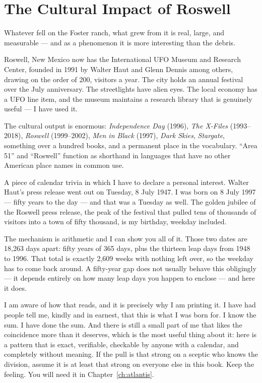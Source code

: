 \section{The Cultural Impact of Roswell}\label{sec:culturalimpactroswell}

Whatever fell on the Foster ranch, what grew from it is real, large, and measurable --- and as a
phenomenon it is more interesting than the debris.

Roswell, New Mexico now has the International UFO Museum and Research Center, founded in 1991 by
Walter Haut and Glenn Dennis among others, drawing on the order of 200, visitors a year. The
city holds an annual festival over the July anniversary. The streetlights have alien eyes. The
local economy has a UFO line item, and the museum maintains a research library that is genuinely
useful --- I have used it.

The cultural output is enormous: \emph{Independence Day} (1996), \emph{The X-Files} (1993--2018),
\emph{Roswell} (1999--2002), \emph{Men in Black} (1997), \emph{Dark Skies}, \emph{Stargate},
something over a hundred books, and a permanent place in the vocabulary. ``Area 51'' and
``Roswell'' function as shorthand in languages that have no other American place names in common
use.

\begin{funfact}
A piece of calendar trivia in which I have to declare a personal interest. Walter Haut's press
release went out on Tuesday, 8 July 1947. I was born on 8 July 1997 --- fifty years to the day ---
and that was a Tuesday as well. The golden jubilee of the Roswell press release, the peak of the
festival that pulled tens of thousands of visitors into a town of fifty thousand, is my birthday,
weekday included.

The mechanism is arithmetic and I can show you all of it. Those two dates are 18,263 days apart:
fifty years of 365 days, plus the thirteen leap days from 1948 to 1996. That total is exactly 2,609
weeks with nothing left over, so the weekday has to come back around. A fifty-year gap does not
usually behave this obligingly --- it depends entirely on how many leap days you happen to enclose
--- and here it does.

I am aware of how that reads, and it is precisely why I am printing it. I have had people tell me,
kindly and in earnest, that this is what I was born for. I know the sum. I have done the sum. And
there is still a small part of me that likes the coincidence more than it deserves, which is the
most useful thing about it: here is a pattern that is exact, verifiable, checkable by anyone with a
calendar, and completely without meaning. If the pull is that strong on a sceptic who knows the
division, assume it is at least that strong on everyone else in this book. Keep the feeling. You
will need it in Chapter~\ref{ch:atlantis}.
\end{funfact}

